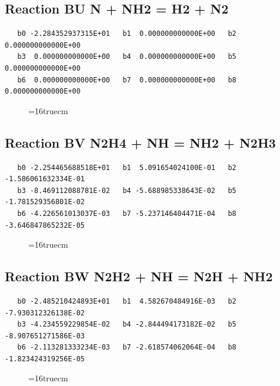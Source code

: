 \documentclass[12pt,dvipdfm]{article}
\begin{document}
\subsection{
Reaction BU N + NH2 = H2 + N2 }
\begin{small}\begin{verbatim}
   b0 -2.284352937315E+01   b1  0.000000000000E+00   b2  0.000000000000E+00
   b3  0.000000000000E+00   b4  0.000000000000E+00   b5  0.000000000000E+00
   b6  0.000000000000E+00   b7  0.000000000000E+00   b8  0.000000000000E+00
\end{verbatim}\end{small}
\begin{figure}[h!] \label{n2rates}
\epsfxsize=16truecm
\end{figure}
\newpage

\subsection{
Reaction BV N2H4 + NH = NH2 + N2H3 }
\begin{small}\begin{verbatim}
   b0 -2.254465688518E+01   b1  5.091654024100E-01   b2 -1.586061632334E-01
   b3 -8.469112088781E-02   b4 -5.688985338643E-02   b5 -1.781529356801E-02
   b6 -4.226561013037E-03   b7 -5.237146404471E-04   b8 -3.646847865232E-05
\end{verbatim}\end{small}
\begin{figure}[h!] \label{n2rates}
\epsfxsize=16truecm
\end{figure}
\newpage

\subsection{
Reaction BW N2H2 + NH = N2H + NH2 }
\begin{small}\begin{verbatim}
   b0 -2.485210424893E+01   b1  4.582670484916E-03   b2 -7.930312326138E-02
   b3 -4.234559229854E-02   b4 -2.844494173182E-02   b5 -8.907651271586E-03
   b6 -2.113281333234E-03   b7 -2.618574062064E-04   b8 -1.823424319256E-05
\end{verbatim}\end{small}
\begin{figure}[h!] \label{n2rates}
\epsfxsize=16truecm
\end{figure}
\newpage
\end{document}
